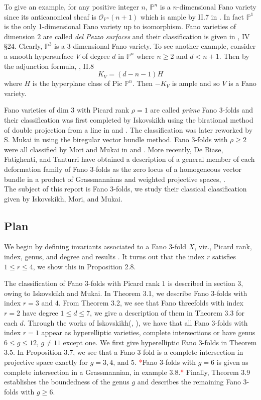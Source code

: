 \documentclass[11pt]{amsart}
\theoremstyle{plain}
\theoremstyle{definition}
\theoremstyle{expl}
\begin{document}
	To give an example, for any positive integer $n$,  $\mathbb{P}^n$ is a $n$-dimensional Fano variety since its anticanonical sheaf is $\mathcal{O}_{\mathbb{P}^n}(n+1)$ which is ample by II.7 in \cite{Hartshorne}. In fact $\mathbb{P}^1$ is the only 1-dimensional Fano variety up to isomorphism. Fano varieties of dimension $2$ are called \textit{del Pezzo surfaces} and their classification is given in \cite{Manin}, IV \S 24. Clearly, $\mathbb{P}^3$ is a $3$-dimensional Fano variety. To see another example, consider a smooth hypersurface $V$ of degree $d$ in $\mathbb{P}^n$ where $n \geq 2$ and $d<n+1$. Then by the adjunction formula, \cite{Hartshorne}, II.8
	\[
	K_V = (d-n-1)H
	\]
    where $H$ is the hyperplane class of Pic $\mathbb{P}^n$. Then $-K_V$ is ample and so $V$ is a Fano variety.
    
 Fano varieties of dim $3$ with Picard rank $\rho =1$ are called \textit{prime} Fano $3$-folds and their classification was first completed by Iskovskikh using the birational method of double projection from a line in \cite{Isk77} and \cite{Isk78}. The classification was later reworked by S. Mukai in \cite{Muk89} using the biregular vector bundle method. Fano $3$-folds with $\rho\geq 2$ were all classified by Mori and Mukai in \cite{MM81} and \cite{MM03}. More recently, De Biase, Fatighenti, and Tanturri have obtained a description of a general member of each deformation family of Fano $3$-folds as the zero locus of a homogeneous vector bundle in a product of Grassmannians and weighted projective spaces, \cite{Hove}.\\
The subject of this report is Fano $3$-folds, we study their classical classification given by Iskovskikh, Mori, and Mukai. 

\subsection{Plan} We begin by defining invariants associated to a Fano $3$-fold $X$, viz., Picard rank, index, genus, and degree and results . It turns out that the index $r$ satisfies $1 \leq r \leq 4$, we show this in Proposition 2.8. 

The classification of Fano $3$-folds with Picard rank $1$ is described in section $3$, owing to Iskovskikh and Mukai. In Theorem 3.1, we describe Fano $3$-folds with index $r=3$ and $4$. From Theorem 3.2, we see that Fano threefolds with index $r=2$ have degree $1\leq d \leq 7$, we give a description of them in Theorem 3.3 for each $d$. Through the works of Iskovskikh(\cite{Isk77}, \cite{Isk78}), we have that all Fano $3$-folds with index $r=1$ appear as hyperelliptic varieties, complete intersections or have genus $6 \leq g \leq 12$, $g\neq 11$ except one. We first give hyperelliptic Fano $3$-folds in Theorem 3.5. In Proposition $3.7$, we see that a Fano $3$-fold is a complete intersection in projective space exactly for $g=3,4$, and $5$. \textcolor{red}{*}Fano $3$-folds with $g=6$ is given as complete intersection in a Grassmannian, in example 3.8.\textcolor{red}{*} Finally, Theorem 3.9 establishes the boundedness of the genus $g$ and describes the remaining Fano $3$-folds with $g\geq 6$. 
\end{document}
